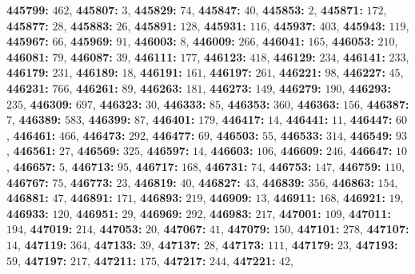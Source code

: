 \textsf{\bfseries 445799:} $462$, \textsf{\bfseries 445807:} $3$, \textsf{\bfseries 445829:} $74$, \textsf{\bfseries 445847:} $40$, \textsf{\bfseries 445853:} $2$, \textsf{\bfseries 445871:} $172$, \textsf{\bfseries 445877:} $28$, \textsf{\bfseries 445883:} $26$, \textsf{\bfseries 445891:} $128$, \textsf{\bfseries 445931:} $116$, \textsf{\bfseries 445937:} $403$, \textsf{\bfseries 445943:} $119$, \textsf{\bfseries 445967:} $66$, \textsf{\bfseries 445969:} $91$, \textsf{\bfseries 446003:} $8$, \textsf{\bfseries 446009:} $266$, \textsf{\bfseries 446041:} $165$, \textsf{\bfseries 446053:} $210$, \textsf{\bfseries 446081:} $79$, \textsf{\bfseries 446087:} $39$, \textsf{\bfseries 446111:} $177$, \textsf{\bfseries 446123:} $418$, \textsf{\bfseries 446129:} $234$, \textsf{\bfseries 446141:} $233$, \textsf{\bfseries 446179:} $231$, \textsf{\bfseries 446189:} $18$, \textsf{\bfseries 446191:} $161$, \textsf{\bfseries 446197:} $261$, \textsf{\bfseries 446221:} $98$, \textsf{\bfseries 446227:} $45$, \textsf{\bfseries 446231:} $766$, \textsf{\bfseries 446261:} $89$, \textsf{\bfseries 446263:} $181$, \textsf{\bfseries 446273:} $149$, \textsf{\bfseries 446279:} $190$, \textsf{\bfseries 446293:} $235$, \textsf{\bfseries 446309:} $697$, \textsf{\bfseries 446323:} $30$, \textsf{\bfseries 446333:} $85$, \textsf{\bfseries 446353:} $360$, \textsf{\bfseries 446363:} $156$, \textsf{\bfseries 446387:} $7$, \textsf{\bfseries 446389:} $583$, \textsf{\bfseries 446399:} $87$, \textsf{\bfseries 446401:} $179$, \textsf{\bfseries 446417:} $14$, \textsf{\bfseries 446441:} $11$, \textsf{\bfseries 446447:} $60$, \textsf{\bfseries 446461:} $466$, \textsf{\bfseries 446473:} $292$, \textsf{\bfseries 446477:} $69$, \textsf{\bfseries 446503:} $55$, \textsf{\bfseries 446533:} $314$, \textsf{\bfseries 446549:} $93$, \textsf{\bfseries 446561:} $27$, \textsf{\bfseries 446569:} $325$, \textsf{\bfseries 446597:} $14$, \textsf{\bfseries 446603:} $106$, \textsf{\bfseries 446609:} $246$, \textsf{\bfseries 446647:} $10$, \textsf{\bfseries 446657:} $5$, \textsf{\bfseries 446713:} $95$, \textsf{\bfseries 446717:} $168$, \textsf{\bfseries 446731:} $74$, \textsf{\bfseries 446753:} $147$, \textsf{\bfseries 446759:} $110$, \textsf{\bfseries 446767:} $75$, \textsf{\bfseries 446773:} $23$, \textsf{\bfseries 446819:} $40$, \textsf{\bfseries 446827:} $43$, \textsf{\bfseries 446839:} $356$, \textsf{\bfseries 446863:} $154$, \textsf{\bfseries 446881:} $47$, \textsf{\bfseries 446891:} $171$, \textsf{\bfseries 446893:} $219$, \textsf{\bfseries 446909:} $13$, \textsf{\bfseries 446911:} $168$, \textsf{\bfseries 446921:} $19$, \textsf{\bfseries 446933:} $120$, \textsf{\bfseries 446951:} $29$, \textsf{\bfseries 446969:} $292$, \textsf{\bfseries 446983:} $217$, \textsf{\bfseries 447001:} $109$, \textsf{\bfseries 447011:} $194$, \textsf{\bfseries 447019:} $214$, \textsf{\bfseries 447053:} $20$, \textsf{\bfseries 447067:} $41$, \textsf{\bfseries 447079:} $150$, \textsf{\bfseries 447101:} $278$, \textsf{\bfseries 447107:} $14$, \textsf{\bfseries 447119:} $364$, \textsf{\bfseries 447133:} $39$, \textsf{\bfseries 447137:} $28$, \textsf{\bfseries 447173:} $111$, \textsf{\bfseries 447179:} $23$, \textsf{\bfseries 447193:} $59$, \textsf{\bfseries 447197:} $217$, \textsf{\bfseries 447211:} $175$, \textsf{\bfseries 447217:} $244$, \textsf{\bfseries 447221:} $42$, 
